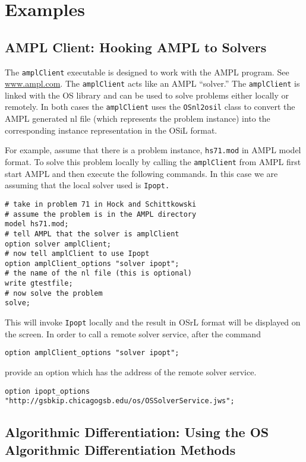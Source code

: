 \documentclass[11pt]{article}
\renewcommand{\_}{{\char"5F}}
\renewcommand{\{}{{\char"7B}}
\renewcommand{\}}{{\char"7D}}
\renewcommand{\^}{{\char"0D}}
\renewcommand{\'}{{\char"0D}}
\begin{document}
\section{Examples}\label{section:examples}

\subsection{AMPL Client:  Hooking AMPL to Solvers}\label{section:amplclient}

The {\tt amplClient} executable is designed to work with the AMPL program. See \url{www.ampl.com}. The {\tt amplClient} acts like an AMPL ``solver.'' The {\tt amplClient} is linked with the OS library and can be used to solve problems either locally or remotely. In both cases the {\tt amplClient} uses the {\tt OSnl2osil} class to convert the AMPL generated nl file (which represents the problem instance) into the corresponding instance representation in the OSiL format.  

For example, assume that there is a problem instance, {\tt hs71.mod} in AMPL model format. To solve this problem locally by calling the {\tt amplClient} from AMPL first start AMPL and then execute the following commands. In this case we are assuming that the local solver used is {\tt Ipopt.} 

\begin{verbatim}
# take in problem 71 in Hock and Schittkowski 
# assume the problem is in the AMPL directory
model hs71.mod;
# tell AMPL that the solver is amplClient
option solver amplClient;
# now tell amplClient to use Ipopt
option amplClient_options "solver ipopt";
# the name of the nl file (this is optional)
write gtestfile;
# now solve the problem
solve;
\end{verbatim}

This will invoke {\tt Ipopt} locally and the result in OSrL format will be displayed on the screen. In order to call a remote solver service, after the command
\begin{verbatim}
option amplClient_options "solver ipopt";
\end{verbatim}
provide an option which has the address of the remote solver service.
\begin{verbatim}
option ipopt_options "http://gsbkip.chicagogsb.edu/os/OSSolverService.jws";
\end{verbatim}

\subsection{Algorithmic Differentiation:  Using the OS Algorithmic Differentiation Methods}\label{section:cppad}
\end{document}
